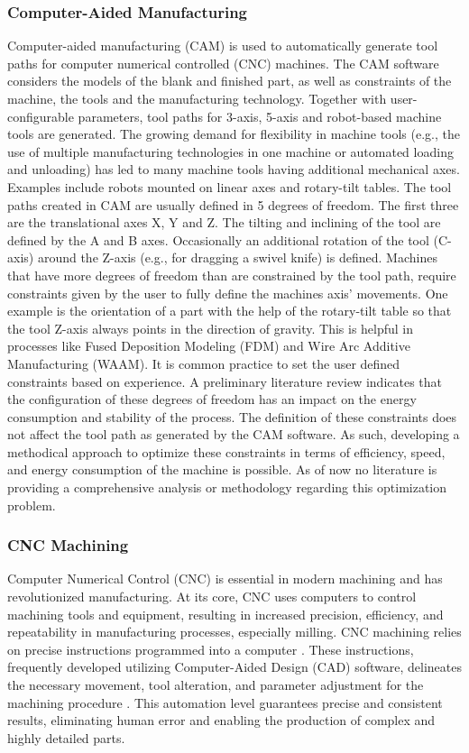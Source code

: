 \documentclass[ZLstudentexpose%
              ,optBiber%
              ,optEnglish%
              ,10pt
              ]{ZLlatex}%
\begin{document}
\subsubsection{Computer-Aided Manufacturing}\label{CAM}
Computer-aided manufacturing (CAM) is used to automatically generate tool paths for computer numerical controlled (CNC) machines. The CAM software considers the models of the blank and finished part, as well as constraints of the machine, the tools and the manufacturing technology. Together with user-configurable parameters, tool paths for 3-axis, 5-axis and robot-based machine tools are generated.
The growing demand for flexibility in machine tools (e.g., the use of multiple manufacturing technologies in one machine or automated loading and unloading) has led to many machine tools having additional mechanical axes. Examples include robots mounted on linear axes and rotary-tilt tables.
The tool paths created in CAM are usually defined in 5 degrees of freedom. The first three are the translational axes X, Y and Z. The tilting and inclining of the tool are defined by the A and B axes. Occasionally an additional rotation of the tool (C-axis) around the Z-axis (e.g., for dragging a swivel knife) is defined.
Machines that have more degrees of freedom than are constrained by the tool path, require constraints given by the user to fully define the machines axis’ movements. One example is the orientation of a part with the help of the rotary-tilt table so that the tool Z-axis always points in the direction of gravity. This is helpful in processes like Fused Deposition Modeling (FDM) and Wire Arc Additive Manufacturing (WAAM). 
It is common practice to set the user defined constraints based on experience. A preliminary literature review indicates that the configuration of these degrees of freedom has an impact on the energy consumption and stability of the process.
\newpage
The definition of these constraints does not affect the tool path as generated by the CAM software. As such, developing a methodical approach to optimize these constraints in terms of efficiency, speed, and energy consumption of the machine is possible. As of now no literature is providing a comprehensive analysis or methodology regarding this optimization problem.


\subsubsection{CNC Machining}
Computer Numerical Control (CNC) is essential in modern machining and has revolutionized manufacturing. At its core, CNC uses computers to control machining tools and equipment, resulting in increased precision, efficiency, and repeatability in manufacturing processes, especially milling. CNC machining relies on precise instructions programmed into a computer \cite{Altintas.2001}. These instructions, frequently developed utilizing Computer-Aided Design (CAD) software, delineates the necessary movement, tool alteration, and parameter adjustment for the machining procedure \cite{Klancnik.2016}. This automation level guarantees precise and consistent results, eliminating human error and enabling the production of complex and highly detailed parts.
\end{document}

